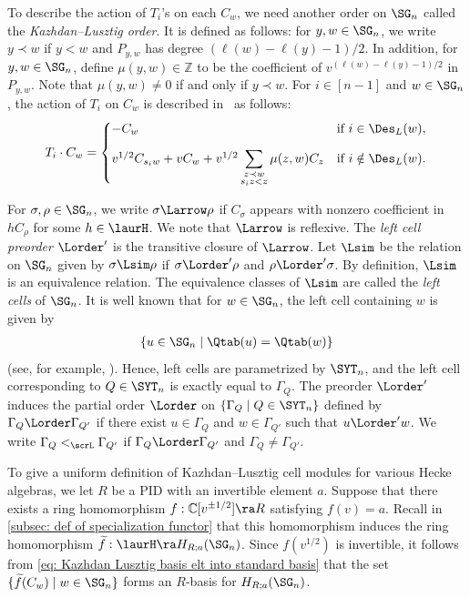 \documentclass[12pt, reqno]{amsart}
\theoremstyle{plain}
\theoremstyle{definition}
\numberwithin{equation}{section}
\numberwithin{figure}{section}
\numberwithin{table}{section}
\def\Z{\mathbb Z}
\def\C{\mathbb C}
\begin{document}
To describe the action of $T_i$'s on each $C_w$, we need another order on $\SG_n$ called the \emph{Kazhdan--Lusztig order}.
It is defined as follows:
for $y, w \in \SG_n$, we write $y \prec w$ if $y < w$ and $P_{y,w}$ has degree $(\ell(w) - \ell(y) - 1)/2$.
In addition, for $y, w \in \SG_n$, define $\mu(y,w) \in \Z$ to be the coefficient of $v^{(\ell(w) - \ell(y) - 1)/2}$ in $P_{y,w}$.
Note that $\mu(y,w) \neq 0$ if and only if $y \prec w$.
For $i \in [n-1]$ and $w \in \SG_n$, the action of $T_i$ on $C_w$ is described in~\cite[p.171]{79KL} as follows:
\begin{align}\label{eq: Ti action on KL elements}
T_i \cdot C_w = \begin{cases}
-C_w & \text{if $i \in \Des_L(w)$}, \\[2ex]
v^{1/2} C_{s_iw} + v C_w + v^{1/2} \displaystyle
\sum_{\substack{z \prec w \\ s_i z < z}} \mu(z,w) C_z & \text{if $i \notin \Des_L(w)$}.
\end{cases}
\end{align}



For $\sigma, \rho \in \SG_n$, we write $\sigma \Larrow  \rho$ if $C_\sigma$ appears with nonzero coefficient in $h C_\rho$ for some $h \in \laurH$.
We note that $\Larrow$ is reflexive.
The \emph{left cell preorder} $\Lorder'$ is the transitive closure of $\Larrow$.
Let $\Lsim$ be the relation on $\SG_n$ given by $\sigma \Lsim \rho$ if $\sigma \Lorder' \rho$ and $\rho \Lorder' \sigma$.
By definition, $\Lsim$ is an equivalence relation.
The equivalence classes of $\Lsim$ are called the \emph{left cells} of $\SG_n$.
It is well known that for $w \in \SG_n$, the left cell containing $w$ is given by
\begin{align}\label{eq: left cell and Q tableau}
\{u \in \SG_n \mid \Qtab(u) = \Qtab(w)\}
\end{align}
(see, for example, \cite{00Ariki, 88GM, 79KL}).
Hence, left cells are parametrized by $\SYT_n$, and the left cell corresponding to $Q \in \SYT_n$ is exactly equal to $\Gamma_Q$.
The preorder $\Lorder'$ induces the partial order $\Lorder$ on $\{\Gamma_Q \mid Q \in \SYT_n \}$ defined by 
$\Gamma_Q \Lorder \Gamma_{Q'}$ if there exist $u \in \Gamma_Q$ and $w \in \Gamma_{Q'}$ such that $u \Lorder' w$.
We write $\Gamma_Q <_{\scrL} \Gamma_{Q'}$ if $\Gamma_Q \Lorder \Gamma_{Q'}$ and $\Gamma_Q \neq \Gamma_{Q'}$.

To give a uniform definition of Kazhdan--Lusztig cell modules for various Hecke algebras, we let $R$ be a PID with an invertible element $a$.
Suppose that there exists a ring homomorphism $f:\C[v^{\pm 1/2}]\ra R$ satisfying $f(v) = a$.
Recall in \cref{subsec: def of specialization functor} that this homomorphism  induces the ring homomorphism $\widetilde{f}: \laurH \ra H_{R;a}(\SG_n)$.
Since $f(v^{1/2})$ is invertible, it follows from \cref{eq: Kazhdan Lusztig basis elt into standard basis} that the set $\{\widetilde{f}(C_w) \mid w \in \SG_n \}$ forms an $R$-basis for $H_{R;a}(\SG_n)$.
\end{document}
